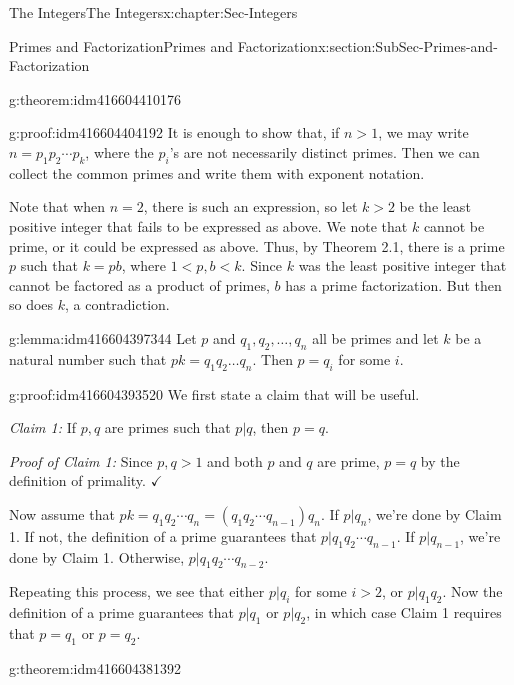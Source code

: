 \documentclass[oneside,10pt,]{book}
\numberwithin{equation}{section}
\newcommand{\lt}{<}
\begin{document}
\begin{chapterptx}{The Integers}{}{The Integers}{}{}{x:chapter:Sec-Integers}
\begin{sectionptx}{Primes and Factorization}{}{Primes and Factorization}{}{}{x:section:SubSec-Primes-and-Factorization}
\begin{theorem}{}{}{g:theorem:idm416604410176}
\end{theorem}
%
\begin{proofptx}{}{g:proof:idm416604404192}
It is enough to show that, if \(n > 1\), we may write \(n = p_1 p_2 \cdots p_k\), where the \(p_i\)'s are not necessarily distinct primes. Then we can collect the common primes and write them with exponent notation.%
\par
Note that when \(n = 2\), there is such an expression, so let \(k > 2\) be the least positive integer that fails to be expressed as above. We note that \(k\) cannot be prime, or it could be expressed as above. Thus, by Theorem 2.1, there is a prime \(p\) such that \(k = p b\), where \(1 \lt p, b \lt k\). Since \(k\) was the least positive integer that cannot be factored as a product of primes, \(b\) has a prime factorization. But then so does \(k\), a contradiction.%
\end{proofptx}
\begin{lemma}{}{}{g:lemma:idm416604397344}%
Let \(p\) and \(q_1, q_2,\ldots,
q_n\) all be primes and let \(k\) be a natural number such that \(pk = q_1 q_2 \ldots q_n\). Then \(p = q_i\) for some \(i\).%
\end{lemma}
\begin{proofptx}{}{g:proof:idm416604393520}
We first state a claim that will be useful.%
\par
\emph{Claim 1:} If \(p,q\) are primes such that \(p|q\), then \(p = q\).%
\par
\emph{Proof of Claim 1:} Since \(p,
q > 1\) and both \(p\) and \(q\) are prime, \(p = q\) by the definition of primality. \(\checkmark\)%
\par
Now assume that \(pk = q_1 q_2 \cdots q_n = (q_1 q_2 \cdots q_{n-1}) q_n\). If \(p|q_n\), we're done by Claim 1. If not, the definition of a prime guarantees that \(p| q_1 q_2 \cdots q_{n-1}\). If \(p|q_{n-1}\), we're done by Claim 1. Otherwise, \(p|q_1 q_2 \cdots q_{n-2}\).%
\par
Repeating this process, we see that either \(p|q_i\) for some \(i > 2\), or \(p|q_1 q_2\). Now the definition of a prime guarantees that \(p|q_1\) or \(p|q_2\), in which case Claim 1 requires that \(p = q_1\) or \(p = q_2\).%
\end{proofptx}
\begin{theorem}{}{}{g:theorem:idm416604381392}%

\end{theorem}
\end{sectionptx}
\end{chapterptx}
\end{document}
